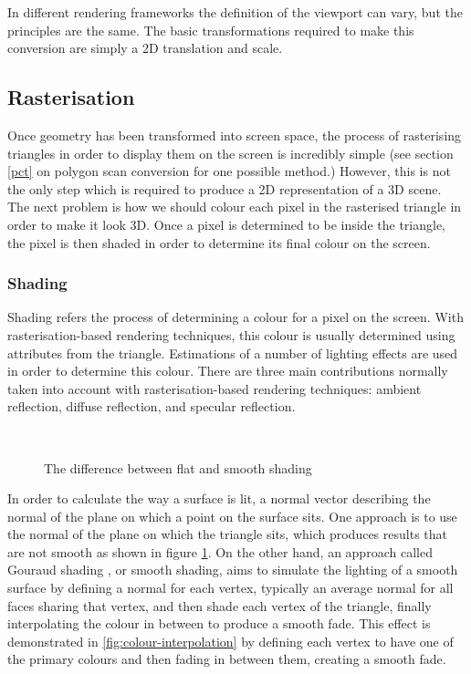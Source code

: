 In different rendering frameworks the definition of the viewport can vary, but the principles are the same. The basic transformations required to make this conversion are simply a 2D translation and scale.

\subsection{Rasterisation}
Once geometry has been transformed into screen space, the process of rasterising triangles in order to display them on the screen is incredibly simple (see section \ref{pct} on polygon scan conversion for one possible method.) However, this is not the only step which is required to produce a 2D representation of a 3D scene. The next problem is how we should colour each pixel in the rasterised triangle in order to make it look 3D. Once a pixel is determined to be inside the triangle, the pixel is then shaded in order to determine its final colour on the screen.

\subsubsection{Shading}
Shading refers the process of determining a colour for a pixel on the screen. With rasterisation-based rendering techniques, this colour is usually determined using attributes from the triangle. Estimations of a number of lighting effects are used in order to determine this colour. There are three main contributions normally taken into account with rasterisation-based rendering techniques: ambient reflection, diffuse reflection, and specular reflection.

\begin{figure}
	\centering
	~

	\caption{The difference between flat and smooth shading}
	\label{fig:flat-vs-smooth-shading}
\end{figure}

In order to calculate the way a surface is lit, a normal vector describing the normal of the plane on which a point on the surface sits. One approach is to use the normal of the plane on which the triangle sits, which produces results that are not smooth as shown in figure \ref{fig:flat-vs-smooth-shading}. On the other hand, an approach called Gouraud shading \parencite{gouraud71shading}, or smooth shading, aims to simulate the lighting of a smooth surface by defining a normal for each vertex, typically an average normal for all faces sharing that vertex, and then shade each vertex of the triangle, finally interpolating the colour in between to produce a smooth fade. This effect is demonstrated in \ref{fig:colour-interpolation} by defining each vertex to have one of the primary colours and then fading in between them, creating a smooth fade.

